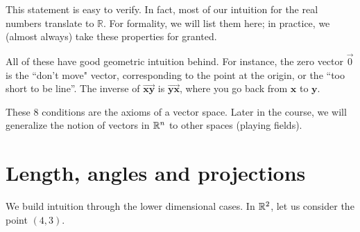 This statement is easy to verify. In fact, most of our intuition for the real numbers translate to $\mathbb{R}$. For formality, we will list them here; in practice, we (almost always) take these properties for granted.
\begin{remark}
	All of these have good geometric intuition behind. For instance, the zero vector $\vec{0}$ is the ``don't move" vector, corresponding to the point at the origin, or the ``too short to be line''. The inverse of $\overrightarrow{\mathbf{xy}}$ is $\overrightarrow{\mathbf{yx}}$, where you go back from $\mathbf{x}$ to $\mathbf{y}$. \begin{tikzpicture}
		
	\end{tikzpicture}
\end{remark}
\begin{remark}
	These $8$ conditions are the axioms of a vector space. Later in the course, we will generalize the notion of vectors in $\reals^n$ to other spaces (playing fields).
\end{remark}
\section{Length, angles and projections}
We build intuition through the lower dimensional cases.
In $\reals^2$, let us consider the point $(4,3)$.\\
\begin{figure}
\end{figure}

